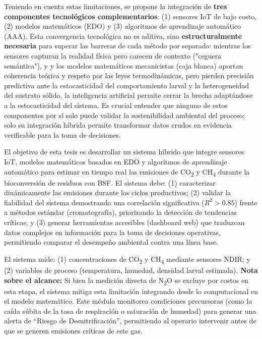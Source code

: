 Teniendo en cuenta estas limitaciones, se propone la integración de \textbf{tres componentes tecnológicos complementarios}: (1) sensores IoT de bajo costo, (2) modelos matemáticos (EDO) y (3) algoritmos de aprendizaje automático (AAA). Esta convergencia tecnológica no es aditiva, sino \textbf{estructuralmente necesaria} para superar las barreras de cada método por separado: mientras los sensores capturan la realidad física pero carecen de contexto ("ceguera semántica"), y y los modelos matemáticos mecanicistas (caja blanca) aportan coherencia teórica y respeto por las leyes termodinámicas, pero pierden precisión predictiva ante la estocasticidad del comportamiento larval y la heterogeneidad del sustrato sólido, la inteligencia artificial permite cerrar la brecha adaptándose a la estocasticidad del sistema. Es crucial entender que ninguno de estos componentes por sí solo puede validar la sostenibilidad ambiental del proceso; solo su integración híbrida permite transformar datos crudos en evidencia verificable para la toma de decisiones.

El objetivo de esta tesis es desarrollar un sistema híbrido que integre sensores IoT, modelos matemáticos basados en EDO y algoritmos de aprendizaje automático para estimar en tiempo real las emisiones de CO\textsubscript{2} y CH\textsubscript{4} durante la bioconversión de residuos con BSF. El sistema debe: (1) caracterizar dinámicamente las emisiones durante los ciclos productivos; (2) validar la fiabilidad del sistema demostrando una correlación significativa ($R^2 > 0.85$) frente a métodos estándar (cromatografía), priorizando la detección de tendencias críticas; y (3) generar herramientas accesibles (dashboard web) que traduzcan datos complejos en información para la toma de decisiones operativas, permitiendo comparar el desempeño ambiental contra una línea base.

El sistema mide: (1) concentraciones de CO\textsubscript{2} y CH\textsubscript{4} mediante sensores NDIR; y (2) variables de proceso (temperatura, humedad, densidad larval estimada). \textbf{Nota sobre el alcance:} Si bien la medición directa de N\textsubscript{2}O se excluye por costos en esta etapa, el sistema mitiga esta limitación integrando desde lo computacional en el modelo matemático. Este módulo monitorea condiciones precursoras (como la caída súbita de la tasa de respiración o saturación de humedad) para generar una alerta de ``Riesgo de Desnitrificación'', permitiendo al operario intervenir antes de que se generen emisiones críticas de este gas.

